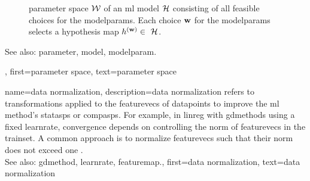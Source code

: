 {{\begin{figure}[H]
\begin{center}
			\end{center} 
		\caption{\Gls{parameter} space $\mathcal{W}$ of an \gls{ml} \gls{model} $\mathcal{H}$ consisting of all 
			feasible choices for the \glspl{modelparam}. Each choice ${\bf w}$ for the \glspl{modelparam} 
			selects a \gls{hypothesis} \gls{map} $\hypothesis^{(\weights)} \in \hypospace$.
			\label{fig_param_space_dict}} 
		\end{figure}
		See also: \gls{parameter}, \gls{model}, \gls{modelparam}.},
	first={parameter space},
	text={parameter space}
}

{name={data normalization},
	description={\Gls{data} normalization refers to transformations 
		applied to the \glspl{featurevec} of \glspl{datapoint} to improve the \gls{ml} method's 
		\glspl{statasp} or \glspl{compasp}. For example, in \gls{linreg} with \glspl{gdmethod} using 
		a fixed \gls{learnrate}, \gls{convergence} depends on controlling the \gls{norm} of \glspl{featurevec} 
		in the \gls{trainset}. A common approach is to normalize \glspl{featurevec} such that their 
		\gls{norm} does not exceed one \cite[Ch.\ 5]{MLBasics}.
				\\
		See also:  \gls{gdmethod}, \gls{learnrate}, \gls{featuremap}.},
	first={data normalization},
	text={data normalization}
}

